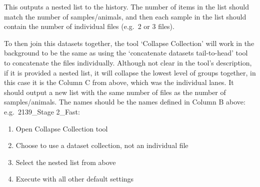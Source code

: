 \documentclass[
]{book}
\providecommand{\tightlist}{%
  \setlength{\itemsep}{0pt}\setlength{\parskip}{0pt}}
\begin{document}
This outputs a nested list to the history. The number of items in the list should match the number of samples/animals, and then each sample in the list should contain the number of individual files (e.g.~2 or 3 files).

To then join this datasets together, the tool `Collapse Collection' will work in the background to be the same as using the `concatenate datasets tail-to-head' tool to concatenate the files individually. Although not clear in the tool's description, if it is provided a nested list, it will collapse the lowest level of groups together, in this case it is the Column C from above, which was the individual lanes. It should output a new list with the same number of files as the number of samples/animals. The names should be the names defined in Column B above: e.g.~2139\_Stage 2\_Fast:

\begin{enumerate}
\def\labelenumi{\arabic{enumi}.}
\tightlist
\item
  Open Collapse Collection tool
\item
  Choose to use a dataset collection, not an individual file
\item
  Select the nested list from above
\item
  Execute with all other default settings
\end{enumerate}
\end{document}
